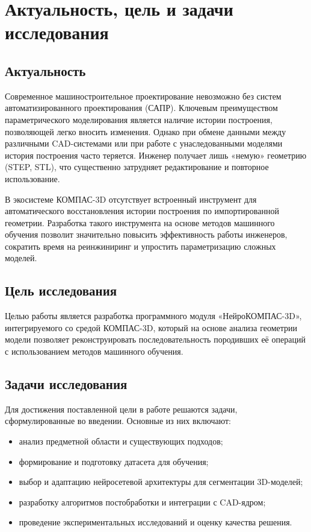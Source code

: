 \section{Актуальность, цель и задачи исследования}

\subsection{Актуальность}
Современное машиностроительное проектирование невозможно без систем автоматизированного проектирования (САПР). Ключевым преимуществом параметрического моделирования является наличие истории построения, позволяющей легко вносить изменения. Однако при обмене данными между различными CAD-системами или при работе с унаследованными моделями история построения часто теряется. Инженер получает лишь «немую» геометрию (STEP, STL), что существенно затрудняет редактирование и повторное использование.

В экосистеме КОМПАС-3D отсутствует встроенный инструмент для автоматического восстановления истории построения по импортированной геометрии. Разработка такого инструмента на основе методов машинного обучения позволит значительно повысить эффективность работы инженеров, сократить время на реинжиниринг и упростить параметризацию сложных моделей.

\subsection{Цель исследования}
Целью работы является разработка программного модуля «НейроКОМПАС-3D», интегрируемого со средой КОМПАС-3D, который на основе анализа геометрии модели позволяет реконструировать последовательность породивших её операций с использованием методов машинного обучения.

\subsection{Задачи исследования}
Для достижения поставленной цели в работе решаются задачи, сформулированные во введении. Основные из них включают:
\begin{itemize}
    \item анализ предметной области и существующих подходов;
    \item формирование и подготовку датасета для обучения;
    \item выбор и адаптацию нейросетевой архитектуры для сегментации 3D-моделей;
    \item разработку алгоритмов постобработки и интеграции с CAD-ядром;
    \item проведение экспериментальных исследований и оценку качества решения.
\end{itemize}


